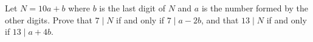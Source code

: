 Let $N=10a+b$ where $b$ is the last digit of $N$ and $a$ is the number formed by the other digits. Prove that $7\mid N$ if and only if $7\mid a-2b$, and that $13\mid N$ if and only if $13\mid a+4b$.

